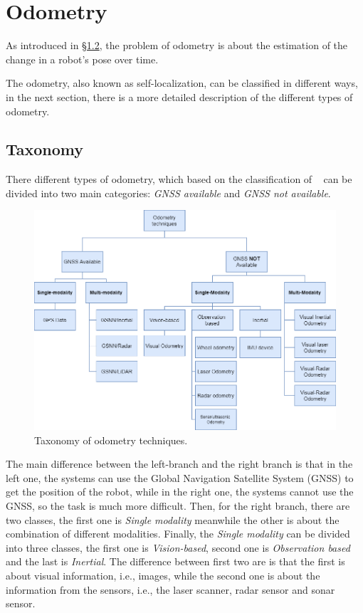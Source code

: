 \section{Odometry}\label{sec:visual-odometry}
As introduced in \hyperref[sec:the-problem]{\S1.2}, the problem of odometry is about the estimation of the change in a robot's pose over time.

The odometry, also known as self-localization, can be classified in different ways, in the next section, there is a more detailed description of the different types of odometry.

\subsection{Taxonomy}\label{subsec:tassonomy}
There different types of odometry, which based on the classification of ~\cite{vo_state_of_art} can be divided into two main categories: \textit{GNSS available} and \textit{GNSS not available}.
\begin{figure}[H]
    \centering
    \includegraphics[width=\textwidth]{images/2_2_taxonomy_odometry}
    \caption{Taxonomy of odometry techniques.}\label{fig:odometry-taxonomy}
\end{figure}
The main difference between the left-branch and the right branch is that in the left one, the systems can use the Global Navigation Satellite System (GNSS) to get the position of the robot, while in the right one, the systems cannot use the GNSS, so the task is much more difficult.
Then, for the right branch, there are two classes, the first one is \textit{Single modality} meanwhile the other is about the combination of different modalities.
Finally, the \textit{Single modality} can be divided into three classes, the first one is \textit{Vision-based}, second one is \textit{Observation based} and the last is \textit{Inertial}.
The difference between first two are is that the first is about visual information, i.e., images, while the second one is about the information from the sensors, i.e., the laser scanner, radar sensor and sonar sensor.

